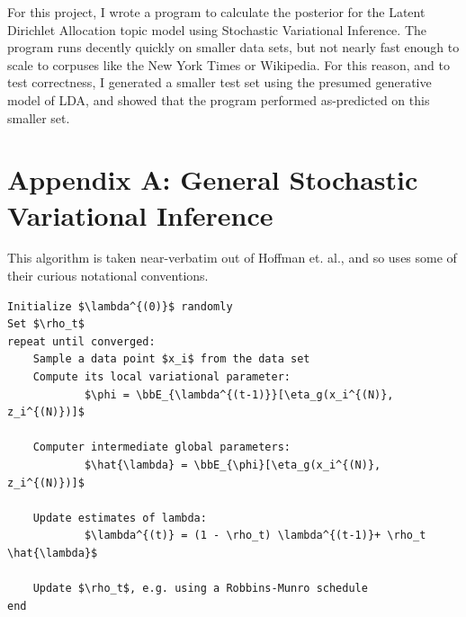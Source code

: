 \documentclass{article}
\newcommand{\bbE}{{\mathbb{E}}}
\begin{document}
For this project, I wrote a program to calculate the posterior for the Latent
Dirichlet Allocation topic model using Stochastic Variational Inference. The
program runs decently quickly on smaller data sets, but not nearly fast enough
to scale to corpuses like the New York Times or Wikipedia. For this reason, and
to test correctness, I generated a smaller test set using the presumed
generative model of LDA, and showed that the program performed as-predicted on
this smaller set.

\nocite{hoffman,blei}




\newpage

\section{Appendix A: General Stochastic Variational Inference}

This algorithm is taken near-verbatim out of Hoffman et. al., and so uses some
of their curious notational conventions.

\begin{lstlisting}[mathescape=true, keywords={}]
Initialize $\lambda^{(0)}$ randomly
Set $\rho_t$
repeat until converged:
	Sample a data point $x_i$ from the data set
	Compute its local variational parameter:
			$\phi = \bbE_{\lambda^{(t-1)}}[\eta_g(x_i^{(N)}, z_i^{(N)})]$

	Computer intermediate global parameters:
			$\hat{\lambda} = \bbE_{\phi}[\eta_g(x_i^{(N)}, z_i^{(N)})]$

	Update estimates of lambda:
			$\lambda^{(t)} = (1 - \rho_t) \lambda^{(t-1)}+ \rho_t \hat{\lambda}$

	Update $\rho_t$, e.g. using a Robbins-Munro schedule
end
\end{lstlisting}
\end{document}
